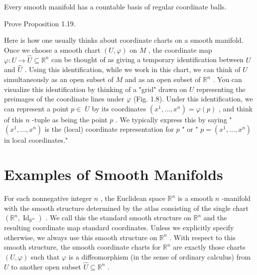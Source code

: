 \begin{proposition}
\label{prop:1-19}
\leanok
{}
Every smooth manifold has a countable basis of regular coordinate balls.
\end{proposition}

\begin{exercise}
\label{exer:1-20}
\leanok
{}
Prove Proposition 1.19.
\end{exercise}

\begin{notation}
\label{not:1-3-extra-2}
\mathlibok
Here is how one usually thinks about coordinate charts on a smooth manifold. Once we choose a smooth chart $\left( {U,\varphi }\right)$ on $M$ , the coordinate map $\varphi  : U \rightarrow  \widehat{U} \subseteq  {\mathbb{R}}^{n}$ can be thought of as giving a temporary identification between $U$ and $\widehat{U}$ . Using this identification, while we work in this chart, we can think of $U$ simultaneously as an open subset of $M$ and as an open subset of ${\mathbb{R}}^{n}$ . You can visualize this identification by thinking of a "grid" drawn on $U$ representing the preimages of the coordinate lines under $\varphi$ (Fig. 1.8). Under this identification, we can represent a point $p \in \; U$ by its coordinates $\left( {{x}^{1},\ldots ,{x}^{n}}\right)  = \varphi \left( p\right)$ , and think of this $n$ -tuple as being the point $p$ . We typically express this by saying " $\left( {{x}^{1},\ldots ,{x}^{n}}\right)$ is the (local) coordinate representation for $p$ " or " $p = \left( {{x}^{1},\ldots ,{x}^{n}}\right)$ in local coordinates."
\end{notation}


\section{Examples of Smooth Manifolds}

\begin{example}
\label{ex:1-22}
\leanok
{}
For each nonnegative integer $n$ , the Euclidean space ${\mathbb{R}}^{n}$ is a smooth $n$ -manifold with the smooth structure determined by the atlas consisting of the single chart $\left( {{\mathbb{R}}^{n},{\operatorname{Id}}_{{\mathbb{R}}^{n}}}\right)$ . We call this the standard smooth structure on ${\mathbb{R}}^{n}$ and the resulting coordinate map standard coordinates. Unless we explicitly specify otherwise, we always use this smooth structure on ${\mathbb{R}}^{n}$ . With respect to this smooth structure, the smooth coordinate charts for ${\mathbb{R}}^{n}$ are exactly those charts $\left( {U,\varphi }\right)$ such that $\varphi$ is a diffeomorphism (in the sense of ordinary calculus) from $U$ to another open subset $\widehat{U} \subseteq  {\mathbb{R}}^{n}$ .
\end{example}

